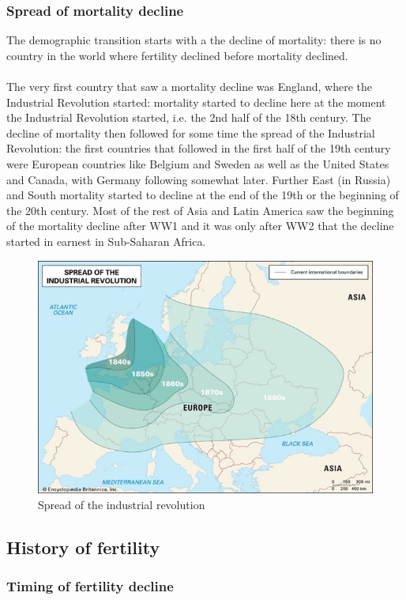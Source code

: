 \documentclass[../summary.tex]{subfiles}
\begin{document}
\subsubsection{Spread of mortality decline}

The demographic transition starts with a the decline of mortality: there is no country in the world where fertility declined before mortality declined.\\
\\
The very first country that saw a mortality decline was England, where the Industrial Revolution started: mortality started to decline here at the moment the Industrial Revolution started, i.e. the 2nd half of the 18th century.  The decline of mortality then followed for some time the spread of the Industrial Revolution: the first countries that followed in the first half of the 19th century were European countries like Belgium and Sweden as well as the United States and Canada, with Germany following somewhat later.  Further East (in Russia) and South mortality started to decline at the end of the 19th or the beginning of the 20th century.  Most of the rest of Asia and Latin America saw the beginning of the mortality decline after WW1 and it was only after WW2 that the decline started in earnest in Sub-Saharan Africa. 

\begin{figure}[H]
	\centering
	\includegraphics[width=0.7\linewidth]{../images/spread_of_industrial_revolution}
	\caption{Spread of the industrial revolution}
	\label{fig:spreadofindustrialrevolution}
\end{figure}

\subsection{History of fertility}
\subsubsection{Timing of fertility decline}
\end{document}
